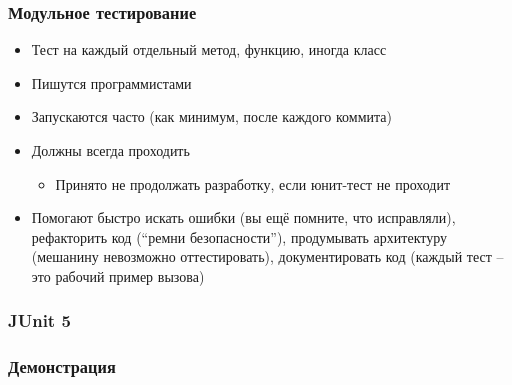 \documentclass[xetex,mathserif,serif]{beamer}
\begin{document}
	\begin{frame}
		\frametitle{Модульное тестирование}
		\begin{itemize}
			\item Тест на каждый отдельный метод, функцию, иногда класс
			\item Пишутся программистами
			\item Запускаются часто (как минимум, после каждого коммита)
			\item Должны всегда проходить
			\begin{itemize}
				\item Принято не продолжать разработку, если юнит-тест не проходит
			\end{itemize}
			\item Помогают быстро искать ошибки (вы ещё помните, что исправляли), рефакторить код (``ремни безопасности''), продумывать архитектуру (мешанину невозможно оттестировать), документировать код (каждый тест -- это рабочий пример вызова)
		\end{itemize}
	\end{frame}

	\begin{frame}
		\frametitle{JUnit 5}
		
	\end{frame}

	\begin{frame}
		\frametitle{Демонстрация}
		
	\end{frame}
\end{document}
